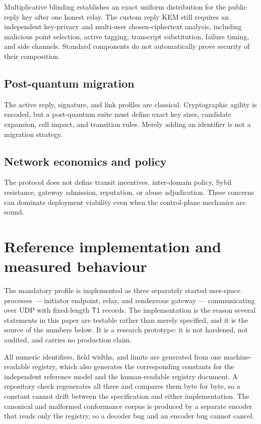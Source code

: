 \documentclass[11pt,oneside]{article}
\newcommand{\Tone}{\ensuremath{\mathsf{T1}}}
\begin{document}
Multiplicative blinding establishes an exact uniform distribution for the public reply key after one honest relay. The custom reply KEM still requires an independent key-privacy and multi-user chosen-ciphertext analysis, including malicious point selection, active tagging, transcript substitution, failure timing, and side channels. Standard components do not automatically prove security of their composition.

\subsection{Post-quantum migration}

The active reply, signature, and link profiles are classical. Cryptographic agility is encoded, but a post-quantum suite must define exact key sizes, candidate expansion, cell impact, and transition rules. Merely adding an identifier is not a migration strategy.

\subsection{Network economics and policy}

The protocol does not define transit incentives, inter-domain policy, Sybil resistance, gateway admission, reputation, or abuse adjudication. These concerns can dominate deployment viability even when the control-plane mechanics are sound.

\section{Reference implementation and measured behaviour}
\label{sec:reference}

The mandatory profile is implemented as three separately started user-space processes --- initiator endpoint, relay, and rendezvous gateway --- communicating over UDP with fixed-length \Tone{} records. The implementation is the reason several statements in this paper are testable rather than merely specified, and it is the source of the numbers below. It is a research prototype: it is not hardened, not audited, and carries no production claim.

All numeric identifiers, field widths, and limits are generated from one machine-readable registry, which also generates the corresponding constants for the independent reference model and the human-readable registry document. A repository check regenerates all three and compares them byte for byte, so a constant cannot drift between the specification and either implementation. The canonical and malformed conformance corpus is produced by a separate encoder that reads only the registry, so a decoder bug and an encoder bug cannot cancel.
\end{document}

